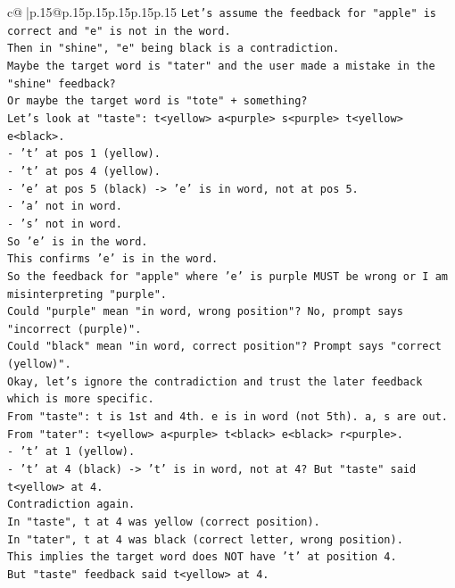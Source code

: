 \documentclass{article}
\begin{document}
{\begin{supertabular}{c@{$\;$}|p{.15\linewidth}@{}p{.15\linewidth}p{.15\linewidth}p{.15\linewidth}p{.15\linewidth}p{.15\linewidth}}
{{{\texttt{Let's assume the feedback for "apple" is correct and "e" is not in the word.} \\
\texttt{Then in "shine", "e" being black is a contradiction.} \\
\texttt{Maybe the target word is "tater" and the user made a mistake in the "shine" feedback?} \\
\texttt{Or maybe the target word is "tote" + something?} \\
\texttt{Let's look at "taste": t<yellow> a<purple> s<purple> t<yellow> e<black>.} \\
\texttt{{-} 't' at pos 1 (yellow).} \\
\texttt{{-} 't' at pos 4 (yellow).} \\
\texttt{{-} 'e' at pos 5 (black) {-}> 'e' is in word, not at pos 5.} \\
\texttt{{-} 'a' not in word.} \\
\texttt{{-} 's' not in word.} \\
\texttt{So 'e' is in the word.} \\
\texttt{This confirms 'e' is in the word.} \\
\texttt{So the feedback for "apple" where 'e' is purple MUST be wrong or I am misinterpreting "purple".} \\
\texttt{Could "purple" mean "in word, wrong position"? No, prompt says "incorrect (purple)".} \\
\texttt{Could "black" mean "in word, correct position"? Prompt says "correct (yellow)".} \\
\texttt{Okay, let's ignore the contradiction and trust the later feedback which is more specific.} \\
\texttt{From "taste": t is 1st and 4th. e is in word (not 5th). a, s are out.} \\
\texttt{From "tater": t<yellow> a<purple> t<black> e<black> r<purple>.} \\
\texttt{{-} 't' at 1 (yellow).} \\
\texttt{{-} 't' at 4 (black) {-}> 't' is in word, not at 4? But "taste" said t<yellow> at 4.} \\
\texttt{Contradiction again.} \\
\texttt{In "taste", t at 4 was yellow (correct position).} \\
\texttt{In "tater", t at 4 was black (correct letter, wrong position).} \\
\texttt{This implies the target word does NOT have 't' at position 4.} \\
\texttt{But "taste" feedback said t<yellow> at 4.} \\
}}}
\end{supertabular}}
\end{document}
